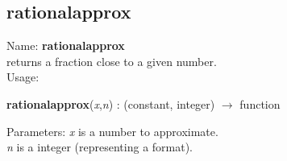 \subsection{ rationalapprox }
\noindent Name: \textbf{rationalapprox}\\
returns a fraction close to a given number.\\

\noindent Usage: 
\begin{center}
\textbf{rationalapprox}(\emph{x},\emph{n}) : (\textsf{constant}, \textsf{integer}) $\rightarrow$ \textsf{function}\\
\end{center}
Parameters: 
\emph{x} is a number to approximate.\\
\emph{n} is a integer (representing a format).\\


